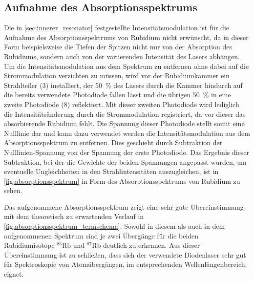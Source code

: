 
 

\subsection{Aufnahme des Absorptionsspektrums}

Die in \cref{sec:innerer_resonator} festgestellte Intensitätsmodulation ist für die 
Aufnahme des Absorptionsspektrums von Rubidium nicht erwünscht, da in dieser Form
beispielsweise die Tiefen der Spitzen nicht nur von der Absorption des Rubidiums,
sondern auch von der variierenden Intensität des Lasers abhängen. 
Um die Intensitätsmodulation aus dem Spektrum zu entfernen ohne dabei auf die
Strommodulation verzichten zu müssen, wird vor der Rubidiumkammer ein Strahlteiler (3) 
installiert, der \SI{50}{\percent} des Lasers durch die Kammer hindurch auf die 
bereits verwendete Photodiode fallen lässt und die übrigen \SI{50}{\percent} in
eine zweite Photodiode (8) reflektiert. Mit dieser zweiten Photodiode wird lediglich
die Intensitätsänderung durch die Strommodulation registriert, da vor dieser das 
absorbierende Rubidium fehlt. Die Spannung dieser Photodiode stellt somit eine
Nulllinie dar und kann dazu verwendet werden die Intensitätsmodulation aus dem 
Absorptionsspektrum zu entfernen. Dies geschieht durch Subtraktion der Nulllinien-Spannung
von der Spannung der erste Photodiode. Das Ergebnis dieser Subtraktion, bei der 
die Gewichte der beiden Spannungen angepasst wurden, um eventuelle Ungleichheiten in den 
Strahlintensitäten auszugleichen, ist in \cref{fig:absorptionsspektrum} in Form des Absorptionsspektrums von 
Rubidium zu sehen.
  
  
  


Das aufgenommene Absorptionsspektrum zeigt eine sehr gute Übereinstimmung mit dem theoretisch 
zu erwartenden Verlauf in \cref{fig:absorptionsspektrum_termschema}.
Sowohl in diesem als auch in dem aufgenommenen 
Spektrum sind je zwei Übergänge für die beiden 
Rubidiumisotope ${}^{85}$Rb und ${}^{87}$Rb deutlich 
zu erkennen. Aus dieser Übereinstimmung
ist zu schließen, dass sich der verwendete Diodenlaser
sehr gut für Spektroskopie von Atomübergängen, im 
entsprechenden Wellenlängenbereich, eignet.




 


